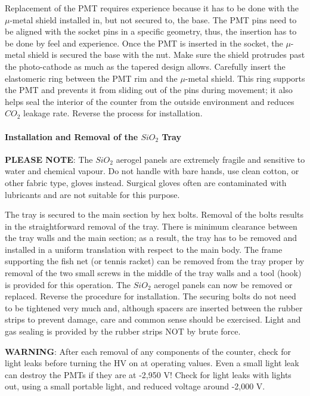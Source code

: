 Replacement of the PMT requires experience because it has to be done with the
$\mu$-metal shield installed in, but not secured to, the base. The PMT pins
need to be aligned with the socket pins in a specific geometry, thus, the
insertion has to be done by feel and experience. Once the PMT is inserted in
the socket, the $\mu$-metal shield is secured the base with the nut. Make sure
the shield protrudes past the photo-cathode as much as the tapered design
allows. Carefully insert the elastomeric ring between the PMT rim and the
$\mu$-metal shield. This ring supports the PMT and prevents it from sliding 
out of the pins during movement; it also helps seal the interior of the counter
from the outside environment and reduces $CO_2$ leakage rate. 
Reverse the process for installation.

\paragraph{Installation and Removal of the $SiO_2$ Tray}

{\bf PLEASE NOTE}: The $SiO_2$ aerogel panels are extremely fragile and sensitive to 
water and chemical vapour. Do not handle with bare hands, use clean cotton, or 
other fabric type, gloves instead. Surgical gloves often are contaminated with 
lubricants and are not suitable for this purpose. 

The tray is secured to the main section by hex bolts. Removal of the bolts 
results in the straightforward removal of the tray. There is minimum clearance 
between the tray walls and the main section; as a result, the tray has to 
be removed and installed in a uniform translation with respect to the main 
body. The frame supporting the fish net (or tennis racket) can be removed from 
the tray proper by removal of the two small screws in the middle of the tray 
walls and a tool (hook) is provided for this operation. The $SiO_2$ aerogel 
panels can now be removed or replaced. Reverse the procedure for installation.
The securing bolts do not need to be tightened very much and, although spacers 
are inserted between the rubber strips to prevent damage, care and common sense 
 should be exercised. Light and gas sealing is provided by the 
rubber strips NOT by brute force.

{\bf WARNING}: After each removal of any components of the counter, check for light 
leaks before turning the HV on at operating values. Even a small light 
leak can destroy the PMTs if they are at -2,950 V! Check for light leaks with 
lights out, using a small portable light, and reduced voltage around -2,000 V.

